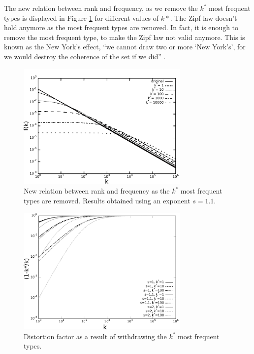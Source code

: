 The new relation between rank and frequency, as we remove the $k^\ast$ most frequent
types is displayed in Figure \ref{fig:newrelarion_s1_1} for different values of
$k\ast$. The Zipf law doesn't hold anymore as the most frequent types are removed.
In fact, it is enough to remove the most frequent type, to make the Zipf law not 
valid anymore. This is known as the New York's effect, ``we cannot draw two or more 
`New York’s', for we would destroy the coherence of the set if we did'' \citep{cristelli2012}.


\begin{figure}[htbp]
\centering
\includegraphics[width=0.75\textwidth]{images/newrelarion_s1_1.pdf}
\caption{New relation between rank and frequency as the $k^\ast$ most frequent types are removed. Results obtained using an exponent $s=1.1$.}
\label{fig:newrelarion_s1_1}
\end{figure}

\begin{figure}[htbp]
\centering
\includegraphics[width=0.75\textwidth]{images/zipf_distortion_factor.pdf}
\caption{Distortion factor as a result of withdrawing the $k^\ast$ most frequent types.}
\label{fig:zipf_distortion_factor}
\end{figure}


